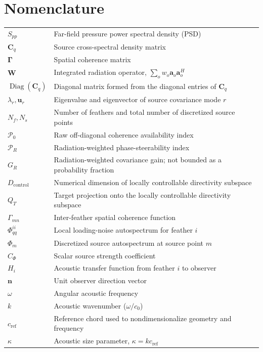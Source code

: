 \documentclass[11pt]{article}
\newcommand{\vect}[1]{\bm{#1}}
\newcommand{\mat}[1]{\bm{#1}}
\begin{document}
\section{Nomenclature}
\begin{longtable}{@{}L{0.15\textwidth}L{0.8\textwidth}@{}}
$S_{pp}$ & Far-field pressure power spectral density (PSD) \\
$\mat{C}_q$ & Source cross-spectral density matrix \\
$\mat{\Gamma}$ & Spatial coherence matrix \\
$\mat{W}$ & Integrated radiation operator, $\sum_o w_o\vect{a}_o\vect{a}_o^H$ \\
$\operatorname{Diag}(\mat{C}_q)$ & Diagonal matrix formed from the diagonal entries of $\mat{C}_q$ \\
$\lambda_r,\vect{u}_r$ & Eigenvalue and eigenvector of source covariance mode $r$ \\
$N_f,N_s$ & Number of feathers and total number of discretized source points \\
$\mathcal P_0$ & Raw off-diagonal coherence availability index \\
$\mathcal P_R$ & Radiation-weighted phase-steerability index \\
$G_R$ & Radiation-weighted covariance gain; not bounded as a probability fraction \\
$D_{\mathrm{control}}$ & Numerical dimension of locally controllable directivity subspace \\
$Q_T$ & Target projection onto the locally controllable directivity subspace \\
$\Gamma_{mn}$ & Inter-feather spatial coherence function \\
$\Phi_{qq}^{ii}$ & Local loading-noise autospectrum for feather $i$ \\
$\Phi_m$ & Discretized source autospectrum at source point $m$ \\
$C_\Phi$ & Scalar source strength coefficient \\
$H_i$ & Acoustic transfer function from feather $i$ to observer \\
$\vect{n}$ & Unit observer direction vector \\
$\omega$ & Angular acoustic frequency \\
$k$ & Acoustic wavenumber ($\omega / c_0$) \\
$c_{\mathrm{ref}}$ & Reference chord used to nondimensionalize geometry and frequency \\
$\kappa$ & Acoustic size parameter, $\kappa = kc_{\mathrm{ref}}$ \\

\end{longtable}
\end{document}
